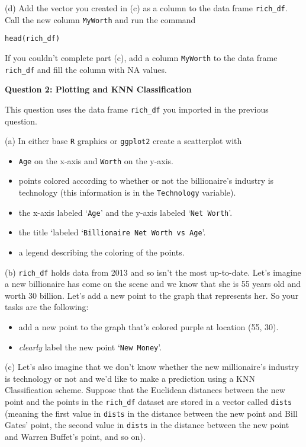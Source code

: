 \documentclass[12pt, leqno]{article}
\begin{document}
(d)  Add the vector you created in (c) as a column to the data frame \texttt{rich\_df}.  Call the new column \texttt{MyWorth} and run the command
\begin{verbatim}
head(rich_df)
\end{verbatim}
If you couldn't complete part (c), add a column \texttt{MyWorth} to the data frame \texttt{rich\_df} and fill the column with NA values.

\newpage

\textbf{Question 2: Plotting and KNN Classification}

This question uses the data frame \texttt{rich\_df} you imported in the previous question.

\vspace{1.5 cm}

(a)  In either base \texttt{R} graphics or \texttt{ggplot2} create a scatterplot with
\begin{itemize}
\item \texttt{Age} on the x-axis and \texttt{Worth} on the y-axis.
\item points colored according to whether or not the billionaire's industry is technology (this information is in the \texttt{Technology} variable).
\item the x-axis labeled `\texttt{Age}' and the y-axis labeled `\texttt{Net Worth}'.
\item the title `labeled `\texttt{Billionaire Net Worth vs Age}'.
\item a legend describing the coloring of the points.
\end{itemize}

\vspace{1.5 cm}

(b) \texttt{rich\_df} holds data from 2013 and so isn't the most up-to-date.  Let's imagine a new billionaire has come on the scene and we know that she is 55 years old and worth 30 billion.  Let's add a new point to the graph that represents her.  So your tasks are the following:
\begin{itemize}
\item add a new point to the graph that's colored purple at location (55, 30).
\item \emph{clearly} label the new point `\texttt{New Money}'.
\end{itemize}

\vspace{1.5 cm}

(c)  Let's also imagine that we don't know whether the new millionaire's industry is technology or not and we'd like to make a prediction using a KNN Classification scheme.  Suppose that the Euclidean distances between the new point and the points in the \texttt{rich\_df} dataset are stored in a vector called \texttt{dists} (meaning the first value in \texttt{dists} in the distance between the new point and Bill Gates' point, the second value in \texttt{dists} in the distance between the new point and Warren Buffet's point, and so on).
\end{document}
